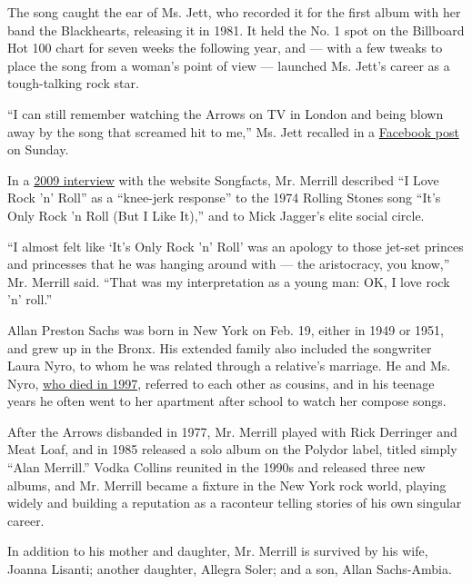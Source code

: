 The song caught the ear of Ms. Jett, who recorded it for the first album
with her band the Blackhearts, releasing it in 1981. It held the No. 1
spot on the Billboard Hot 100 chart for seven weeks the following year,
and --- with a few tweaks to place the song from a woman's point of view
--- launched Ms. Jett's career as a tough-talking rock star.

``I can still remember watching the Arrows on TV in London and being
blown away by the song that screamed hit to me,'' Ms. Jett recalled in a
\href{https://www.facebook.com/joanjettandtheblackhearts/photos/a.129315806006/10157987982441007/?type=3\&theater}{Facebook
post} on Sunday.

In a
\href{https://www.songfacts.com/blog/interviews/alan-merrill-of-the-arrows}{2009
interview} with the website Songfacts, Mr. Merrill described ``I Love
Rock 'n' Roll'' as a ``knee-jerk response'' to the 1974 Rolling Stones
song ``It's Only Rock 'n Roll (But I Like It),'' and to Mick Jagger's
elite social circle.

``I almost felt like `It's Only Rock 'n' Roll' was an apology to those
jet-set princes and princesses that he was hanging around with --- the
aristocracy, you know,'' Mr. Merrill said. ``That was my interpretation
as a young man: OK, I love rock 'n' roll.''

Allan Preston Sachs was born in New York on Feb. 19, either in 1949 or
1951, and grew up in the Bronx. His extended family also included the
songwriter Laura Nyro, to whom he was related through a relative's
marriage. He and Ms. Nyro,
\href{https://www.nytimes.com/1997/04/10/arts/laura-nyro-intense-balladeer-of-60-s-and-70-s-dies-at-49.html}{who
died in 1997}, referred to each other as cousins, and in his teenage
years he often went to her apartment after school to watch her compose
songs.

After the Arrows disbanded in 1977, Mr. Merrill played with Rick
Derringer and Meat Loaf, and in 1985 released a solo album on the
Polydor label, titled simply ``Alan Merrill.'' Vodka Collins reunited in
the 1990s and released three new albums, and Mr. Merrill became a
fixture in the New York rock world, playing widely and building a
reputation as a raconteur telling stories of his own singular career.

In addition to his mother and daughter, Mr. Merrill is survived by his
wife, Joanna Lisanti; another daughter, Allegra Soler; and a son, Allan
Sachs-Ambia.

\href{https://www.nytimes.com/interactive/2020/obituaries/people-died-coronavirus-obituaries.html?action=click\&pgtype=Article\&state=default\&region=BELOW_MAIN_CONTENT\&context=covid_obits_promo}{}

